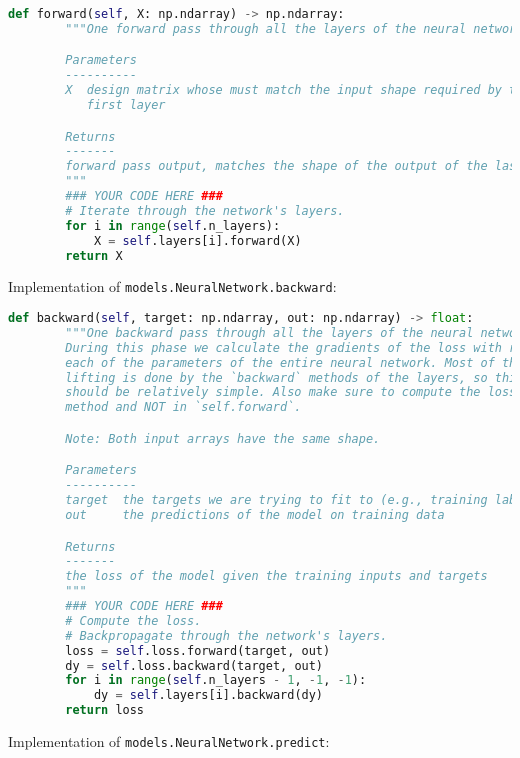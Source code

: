 \begin{lstlisting}[language=Python]
    def forward(self, X: np.ndarray) -> np.ndarray:
        """One forward pass through all the layers of the neural network.

        Parameters
        ----------
        X  design matrix whose must match the input shape required by the
           first layer

        Returns
        -------
        forward pass output, matches the shape of the output of the last layer
        """
        ### YOUR CODE HERE ###
        # Iterate through the network's layers.
        for i in range(self.n_layers):
            X = self.layers[i].forward(X)
        return X

\end{lstlisting}

Implementation of \texttt{models.NeuralNetwork.backward}:

\begin{lstlisting}[language=Python]
    def backward(self, target: np.ndarray, out: np.ndarray) -> float:
        """One backward pass through all the layers of the neural network.
        During this phase we calculate the gradients of the loss with respect to
        each of the parameters of the entire neural network. Most of the heavy
        lifting is done by the `backward` methods of the layers, so this method
        should be relatively simple. Also make sure to compute the loss in this
        method and NOT in `self.forward`.

        Note: Both input arrays have the same shape.

        Parameters
        ----------
        target  the targets we are trying to fit to (e.g., training labels)
        out     the predictions of the model on training data

        Returns
        -------
        the loss of the model given the training inputs and targets
        """
        ### YOUR CODE HERE ###
        # Compute the loss.
        # Backpropagate through the network's layers.
        loss = self.loss.forward(target, out)
        dy = self.loss.backward(target, out)
        for i in range(self.n_layers - 1, -1, -1):
            dy = self.layers[i].backward(dy)
        return loss

\end{lstlisting}

Implementation of \texttt{models.NeuralNetwork.predict}:

